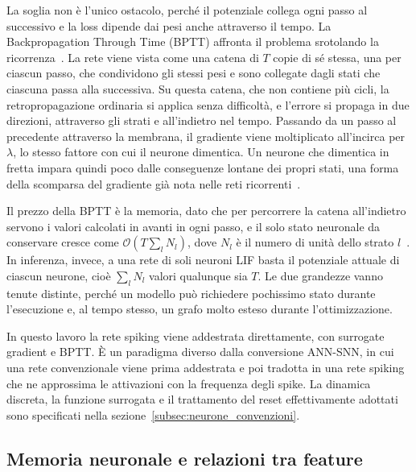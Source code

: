 La soglia non è l'unico ostacolo, perché il potenziale collega ogni passo al successivo e la loss dipende dai pesi anche attraverso il tempo. La Backpropagation Through Time (BPTT) affronta il problema srotolando la ricorrenza~\cite{wu2018spatiotemporal}. La rete viene vista come una catena di $T$ copie di sé stessa, una per ciascun passo, che condividono gli stessi pesi e sono collegate dagli stati che ciascuna passa alla successiva. Su questa catena, che non contiene più cicli, la retropropagazione ordinaria si applica senza difficoltà, e l'errore si propaga in due direzioni, attraverso gli strati e all'indietro nel tempo. Passando da un passo al precedente attraverso la membrana, il gradiente viene moltiplicato all'incirca per $\lambda$, lo stesso fattore con cui il neurone dimentica. Un neurone che dimentica in fretta impara quindi poco dalle conseguenze lontane dei propri stati, una forma della scomparsa del gradiente già nota nelle reti ricorrenti~\cite{pascanu2013difficulty}.

Il prezzo della BPTT è la memoria, dato che per percorrere la catena all'indietro servono i valori calcolati in avanti in ogni passo, e il solo stato neuronale da conservare cresce come $\mathcal O(T\sum_l N_l)$, dove $N_l$ è il numero di unità dello strato $l$~\cite{neftci2019surrogate}. In inferenza, invece, a una rete di soli neuroni LIF basta il potenziale attuale di ciascun neurone, cioè $\sum_l N_l$ valori qualunque sia $T$. Le due grandezze vanno tenute distinte, perché un modello può richiedere pochissimo stato durante l'esecuzione e, al tempo stesso, un grafo molto esteso durante l'ottimizzazione.

In questo lavoro la rete spiking viene addestrata direttamente, con surrogate gradient e BPTT. È un paradigma diverso dalla conversione ANN-SNN, in cui una rete convenzionale viene prima addestrata e poi tradotta in una rete spiking che ne approssima le attivazioni con la frequenza degli spike. La dinamica discreta, la funzione surrogata e il trattamento del reset effettivamente adottati sono specificati nella sezione~\ref{subsec:neurone_convenzioni}.

\subsection{Memoria neuronale e relazioni tra feature}
\label{subsec:memoria_relazioni}

